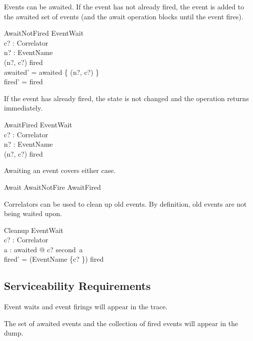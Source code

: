 \documentclass[a4paper]{article}
\begin{document}
Events can be awaited. If the event has not already fired, the event is added to the awaited set of
events (and the await operation blocks until the event fires).
\begin{schema}{AwaitNotFired}
  \Delta EventWait \\
  c? : Correlator \\
  n? : EventName \\
 \where
  (n?, c?) \notin \dom fired \\
  awaited' = awaited \cup \{ (n?, c?) \} \\
  fired' = fired \\
 \end{schema}
 
 If the event has already fired, the state is not changed and the operation returns immediately.
 \begin{schema}{AwaitFired}
  \Xi EventWait \\
  c? : Correlator \\
  n? : EventName \\
 \where
  (n?, c?) \in \dom fired \\
 \end{schema}
 
 Awaiting an event covers either case.
 \begin{zed}
  Await  AwaitNotFire \lor AwaitFired \\
 \end{zed}

Correlators can be used to clean up old events. By definition, old events are not being waited upon.
\begin{schema}{Cleanup}
  \Delta EventWait \\
  c? : Correlator \\
 \where
  \forall a : awaited @ c? \neq second~a \\
  fired' = (EventName \cross \{c? \}) \ndres fired \\
 \end{schema}

\subsection{Serviceability Requirements}

Event waits and event firings will appear in the trace.

The set of awaited events and the collection of fired events will appear in the dump.

\clearpage
\end{document}
